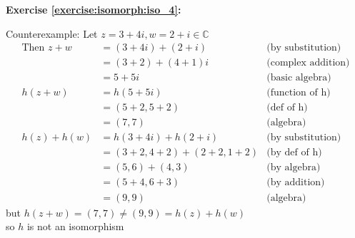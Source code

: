 \noindent\textbf{Exercise \ref{exercise:isomorph:iso_4}:}
\begin{figure}[H]
\end{figure}
Counterexample: Let $z = 3 + 4i, w = 2 + i \in {\mathbb C}$
\begin{align*}
\text{Then\ } z + w &= (3 + 4i) + (2 + i) &\text{(by substitution)}
\\
&= (3 + 2) + (4 + 1)i &\text{(complex addition)}
\\
&= 5 + 5i &\text{(basic algebra)}
\\
h(z + w) &= h(5 + 5i) &\text{(function of h)}
\\
&= (5 + 2, 5 + 2) &\text{(def of h)}
\\
&= (7, 7) &\text{(algebra)}
\\
h(z) + h(w) &= h(3 + 4i) + h(2 + i) &\text{(by substitution)}
\\
&= (3 + 2, 4 + 2) + (2 + 2, 1 + 2) &\text{(by def of h)}
\\
&= (5, 6) + (4, 3) &\text{(by algebra)}
\\
&= (5 + 4, 6 + 3) &\text{(by addition)}
\\
&= (9, 9) &\text{(algebra)}
\end{align*}
but $h(z + w) = (7, 7) \neq (9, 9) = h(z) + h(w)$
\\
so $h$ is not an isomorphism
\\
\\

